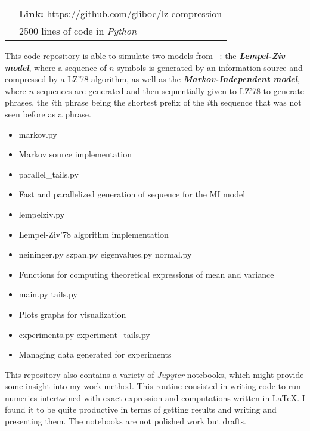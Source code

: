 \begin{tabular}{ll}
    &\textbf{Link:} \url{https://github.com/gliboc/lz-compression}\\
    &{\color{gray} 2500} lines of code in \emph{Python}
\end{tabular}

\bigskip
\noindent
This code repository is able to simulate two models 
from~\cite{jacquet_average_2001} : the \emph{\bfseries Lempel-Ziv model}, 
where a sequence of $n$ symbols is generated by an information
source and compressed by a LZ'78 algorithm, as well as the 
\emph{\bfseries Markov-Independent model}, where $n$ sequences are generated 
and then sequentially given to LZ'78 to generate phrases,
the $i$th phrase being the shortest prefix of the $i$th
sequence that was not seen before as a phrase. 

\bigskip
\begin{itemize}[nosep]
    \item[] {\color{gray} markov.py } 
    \item[] \quad Markov source implementation 
    \item[] {\color{gray} parallel\_tails.py} 
    \item[] \quad Fast and parallelized generation of sequence
    for the MI model
    \item[] {\color{gray} lempelziv.py} 
    \item[] \quad Lempel-Ziv'78 algorithm implementation
    \item[] {\color{gray} neininger.py  szpan.py  eigenvalues.py  normal.py} 
    \item[] \quad Functions for computing theoretical 
    expressions of mean and variance
    \item[] {\color{gray} main.py  tails.py} 
    \item[] \quad Plots graphs for visualization
    \item[] {\color{gray} experiments.py  experiment\_tails.py} 
    \item[] \quad Managing data generated for experiments
\end{itemize}

\bigskip
This repository also contains a variety of \emph{Jupyter} notebooks,
which might provide some insight into my work method. This routine 
consisted in writing code to run numerics intertwined with exact 
expression and computations written in \LaTeX. I found it to be
quite productive in terms of getting results and writing and presenting 
them. The notebooks are not polished work but drafts.
